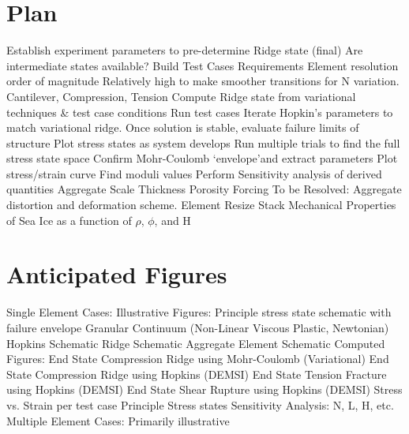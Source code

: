 \section{Plan}
\begin{outline}[enumerate]
\1 Establish experiment parameters to pre-determine Ridge state (final)
\2 Are intermediate states available?
\1 Build Test Cases
\2 Requirements
\3 Element resolution order of magnitude
\4 Relatively high to make smoother transitions for N variation.
\3 Cantilever, Compression, Tension
\1 Compute Ridge state from variational techniques \& test case conditions
\1 Run test cases
\1 Iterate Hopkin's parameters to match variational ridge.
\1 Once solution is stable, evaluate failure limits of structure
\2 Plot stress states as system develops
\3 Run multiple trials to find the full stress state space
\3 Confirm Mohr-Coulomb \lq envelope\rq and extract parameters
\2 Plot stress/strain curve
\3 Find moduli values
\1 Perform Sensitivity analysis of derived quantities
\2 Aggregate Scale
\2 Thickness
\2 Porosity
\2 Forcing
\1 To be Resolved:
\2 Aggregate distortion and deformation scheme.
\3 Element Resize
\3 Stack
\2 Mechanical Properties of Sea Ice as a function of $\rho$, $\phi$, and H
\end{outline}
\pagebreak

\section{Anticipated Figures}
\begin{outline}[enumerate]
\1 Single Element Cases:
\2 Illustrative Figures:
\3 Principle stress state schematic with failure envelope
\4 Granular
\4 Continuum (Non-Linear Viscous Plastic, Newtonian)
\3 Hopkins Schematic
\3 Ridge Schematic
\3 Aggregate Element Schematic
\2 Computed Figures:
\3 End State Compression Ridge using Mohr-Coulomb (Variational)
\3 End State Compression Ridge using Hopkins (DEMSI)
\3 End State Tension Fracture using Hopkins (DEMSI)
\3 End State Shear Rupture using Hopkins (DEMSI)
\3 Stress vs. Strain per test case
\3 Principle Stress states
\2 Sensitivity Analysis:
\3 N, L, H, etc.
\1 Multiple Element Cases:
\2 Primarily illustrative
\end{outline}
\pagebreak

